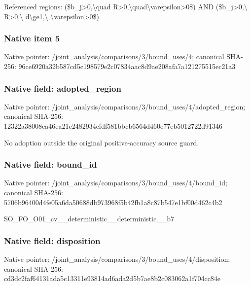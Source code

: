 \documentclass[10pt,a4paper]{article}
\begin{document}
\begingroup\raggedright\sloppy Referenced regions:\allowbreak{} (\$b\_\allowbreak{}j>0,\allowbreak{}\textbackslash{}quad R>0,\allowbreak{}\textbackslash{}quad\textbackslash{}varepsilon>0\$) AND (\$b\_\allowbreak{}j>0,\allowbreak{}\textbackslash{} R>0,\allowbreak{}\textbackslash{} d\textbackslash{}ge1,\allowbreak{}\textbackslash{} \textbackslash{}varepsilon>0\$)\par\endgroup

\subsubsection{Native item 5}
Native pointer: /joint\_\allowbreak{}analysis/comparisons/3/bound\_\allowbreak{}uses/4; canonical SHA-256: 96ce6920a32b587cd5c198579e2c07834aac8d9ae208afa7a121275515ec21a3

\subsubsection{Native field: adopted\_\allowbreak{}region}
Native pointer: /joint\_\allowbreak{}analysis/comparisons/3/bound\_\allowbreak{}uses/4/adopted\_\allowbreak{}region; canonical SHA-256: 12322a38008ca46ea21c2482934efdf581bbcb6564d460e77eb5012722d91346

\begingroup\raggedright\sloppy No adoption outside the original positive-accuracy source guard.\par\endgroup

\subsubsection{Native field: bound\_\allowbreak{}id}
Native pointer: /joint\_\allowbreak{}analysis/comparisons/3/bound\_\allowbreak{}uses/4/bound\_\allowbreak{}id; canonical SHA-256: 5706b96400d4fe05a6da50688db973968f5b42fb1a8c87b547e1bf00d462c4b2

\begingroup\raggedright\sloppy SO\_\allowbreak{}FO\_\allowbreak{}O01\_\allowbreak{}cv\_\allowbreak{}\_\allowbreak{}deterministic\_\allowbreak{}\_\allowbreak{}deterministic\_\allowbreak{}\_\allowbreak{}b7\par\endgroup

\subsubsection{Native field: disposition}
Native pointer: /joint\_\allowbreak{}analysis/comparisons/3/bound\_\allowbreak{}uses/4/disposition; canonical SHA-256: cd3dc2faf64131ada5c13311e93814ad6ada2d5b7ae8b2c083062a1f704cc84e
\end{document}

